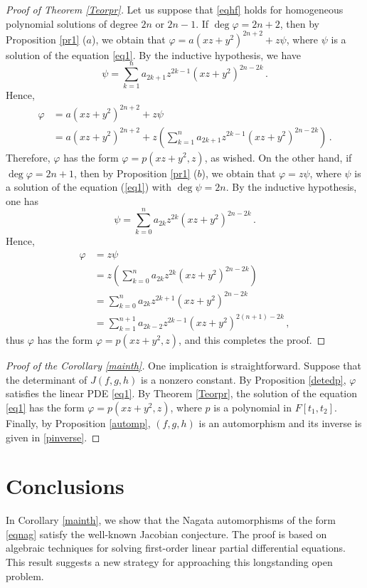 \documentclass{amsart}
\begin{document}
\begin{proof}[Proof of Theorem \ref{Teorpr}]
	Let us suppose that \eqref{eqhf} holds for homogeneous polynomial solutions of degree $2n$ or $2n-1$.
	If $\deg\varphi=2n+2$, then by Proposition \ref{pr1} ($a$), we obtain that $\varphi=a(xz+y^2)^{2n+2}+z\psi$, where $\psi$ is a solution of the equation \eqref{eq1}. By the inductive hypothesis, we have 
	$$
	\psi=\sum_{k=1}^{n}a_{2k+1}z^{2k-1}(xz+y^2)^{2n-2k}\,.
	$$
	Hence,
	\begin{align*}
		\varphi&=a(xz+y^2)^{2n+2}+z\psi\\
		&=a(xz+y^2)^{2n+2}+z\left(\sum_{k=1}^{n}a_{2k+1}z^{2k-1}(xz+y^2)^{2n-2k}\right)
		\,.
	\end{align*}
	Therefore, $\varphi$ has the form $\varphi=p(xz+y^2,z)$, as wished. 
	On the other hand, if $\deg\varphi=2n+1$, then by Proposition \ref{pr1} ($b$), we obtain that $\varphi=z\psi$, where $\psi$ is a solution of the equation (\ref{eq1}) with $\deg \psi=2n$. By the inductive hypothesis, one has
	$$
	\psi=\sum_{k=0}^{n}a_{2k}z^{2k}(xz+y^2)^{2n-2k}\,.
	$$
	Hence,
	\begin{align*}
		\varphi&=z\psi\\
		&=z\left(\sum_{k=0}^{n}a_{2k}z^{2k}(xz+y^2)^{2n-2k}\right)\\
		&=\sum_{k=0}^{n}a_{2k}z^{2k+1}(xz+y^2)^{2n-2k}\\
		&=\sum_{k=1}^{n+1}a_{2k-2}z^{2k-1}(xz+y^2)^{2(n+1)-2k}\,,
	\end{align*}
	thus $\varphi$ has the form $\varphi=p(xz+y^2,z)$, and this completes the proof.
\end{proof}


\begin{proof}[Proof of the Corollary \ref{mainth}]
	One implication is straightforward. Suppose that the determinant of $ J(f,g,h)$ is a nonzero constant. By Proposition \ref{detedp}, $\varphi$ satisfies the linear PDE \eqref{eq1}. By Theorem \ref{Teorpr}, the solution of the equation \eqref{eq1} has the form $\varphi=p(xz+y^2,z)$, where $p$ is a polynomial in $F[t_1,t_2]$. Finally, by Proposition \ref{automp},  $(f,g,h)$ is an automorphism and its inverse is given in \eqref{pinverse}. 
\end{proof}
 


\section{Conclusions}

In Corollary \ref{mainth}, we show that the Nagata automorphisms of the form \eqref{eqnag} satisfy the well-known Jacobian conjecture. The proof is based on algebraic techniques for solving first-order linear partial differential equations. This result suggests a new strategy for approaching this longstanding open problem.
\end{document}

